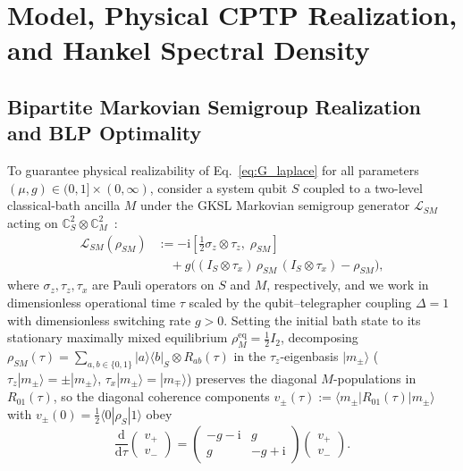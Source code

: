 \documentclass[twocolumn,10pt,amsmath,amssymb,floatfix]{revtex4-2}
\theoremstyle{plain}
\theoremstyle{definition}
\newcommand{\dd}{\mathrm{d}}
\newcommand{\ii}{\mathrm{i}}
\begin{document}
\section{Model, Physical CPTP Realization, and Hankel Spectral Density}
\label{sec:model}

\subsection{Bipartite Markovian Semigroup Realization and BLP Optimality}
\label{subsec:rtn_realization}

To guarantee physical realizability of Eq.~\eqref{eq:G_laplace} for all parameters $(\mu,g) \in (0,1] \times (0,\infty)$, consider a system qubit $S$ coupled to a two-level classical-bath ancilla $M$ under the GKSL Markovian semigroup generator $\mathcal{L}_{SM}$ acting on $\mathbb{C}^2_S \otimes \mathbb{C}^2_M$~\cite{Daffer2004PRA,Megier2017SciRep}:
\begin{align}
\label{eq:rtn_gksl}
\mathcal{L}_{SM}(\rho_{SM}) &:= -\ii\left[\frac{1}{2}\sigma_z \otimes \tau_z,\;\rho_{SM}\right] \nonumber\\
&\quad + g\Big((I_S \otimes \tau_x)\,\rho_{SM}\,(I_S \otimes \tau_x) - \rho_{SM}\Big),
\end{align}
where $\sigma_z,\tau_z,\tau_x$ are Pauli operators on $S$ and $M$, respectively, and we work in dimensionless operational time $\tau$ scaled by the qubit--telegrapher coupling $\Delta = 1$ with dimensionless switching rate $g > 0$. Setting the initial bath state to its stationary maximally mixed equilibrium $\rho_M^{\mathrm{eq}} = \frac{1}{2}I_2$, decomposing $\rho_{SM}(\tau) = \sum_{a,b\in\{0,1\}} |a\rangle\langle b|_S \otimes R_{ab}(\tau)$ in the $\tau_z$-eigenbasis $|m_\pm\rangle$ ($\tau_z|m_\pm\rangle = \pm|m_\pm\rangle$, $\tau_x|m_\pm\rangle = |m_\mp\rangle$) preserves the diagonal $M$-populations in $R_{01}(\tau)$, so the diagonal coherence components $v_\pm(\tau) := \langle m_\pm| R_{01}(\tau)|m_\pm\rangle$ with $v_\pm(0) = \frac{1}{2}\langle 0|\rho_S|1\rangle$ obey
\begin{equation}
\frac{\dd}{\dd\tau}\begin{pmatrix} v_+ \\ v_- \end{pmatrix}
= \begin{pmatrix} -g - \ii & g \\ g & -g + \ii \end{pmatrix} \begin{pmatrix} v_+ \\ v_- \end{pmatrix}.
\end{equation}
\end{document}
